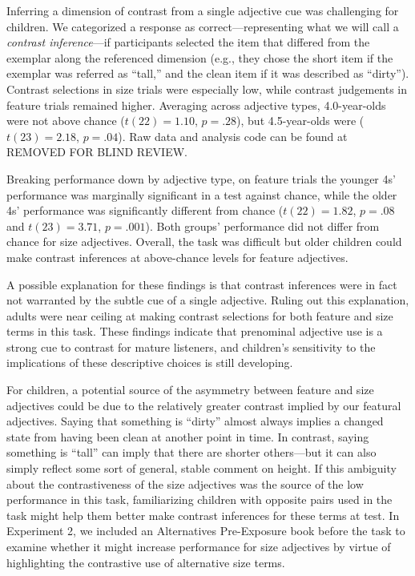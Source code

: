 \documentclass[man]{apa2}
\begin{document}
Inferring a dimension of contrast from a single adjective cue was challenging for children. We categorized a response as correct---representing what we will call a \emph{contrast inference}---if participants selected the item that differed from the exemplar along the referenced dimension (e.g., they chose the short item if the exemplar was referred as ``tall,'' and the clean item if it was described as ``dirty'').  Contrast selections in size trials were especially low, while contrast judgements in feature trials remained higher. Averaging across adjective types, 4.0-year-olds were not above chance ($t(22) = 1.10$, $p = .28$), but 4.5-year-olds were ($t(23)=2.18$, $p = .04$). Raw data and analysis code can be found at REMOVED FOR BLIND REVIEW. 

Breaking performance down by adjective type, on feature trials the younger 4s' performance was marginally significant in a test against chance, while the older 4s' performance was significantly different from chance ($t(22) = 1.82$, $p = .08$ and $t(23)=3.71$, $p = .001$). Both groups' performance did not differ from chance for size adjectives. Overall, the task was difficult but older children could make contrast inferences at above-chance levels for feature adjectives. 

A possible explanation for these findings is that contrast inferences were in fact not warranted by the subtle cue of a single adjective. Ruling out this explanation, adults were near ceiling at making contrast selections for both feature and size terms in this task. These findings indicate that prenominal adjective use is a strong cue to contrast for mature listeners, and children's sensitivity to the implications of these descriptive choices is still developing.

For children, a potential source of the asymmetry between feature and size adjectives could be due to the relatively greater contrast implied by our featural adjectives. Saying that something is ``dirty'' almost always implies a changed state from having been clean at another point in time. In contrast, saying something is ``tall'' can imply that there are shorter others---but it can also simply reflect some sort of general, stable comment on height. If this ambiguity about the contrastiveness of the size adjectives was the source of the low performance in this task, familiarizing children with opposite pairs used in the task might help them better make contrast inferences for these terms at test. In Experiment 2, we included an Alternatives Pre-Exposure book before the task to examine whether it might increase performance for size adjectives by virtue of highlighting the contrastive use of alternative size terms. 
\end{document}
